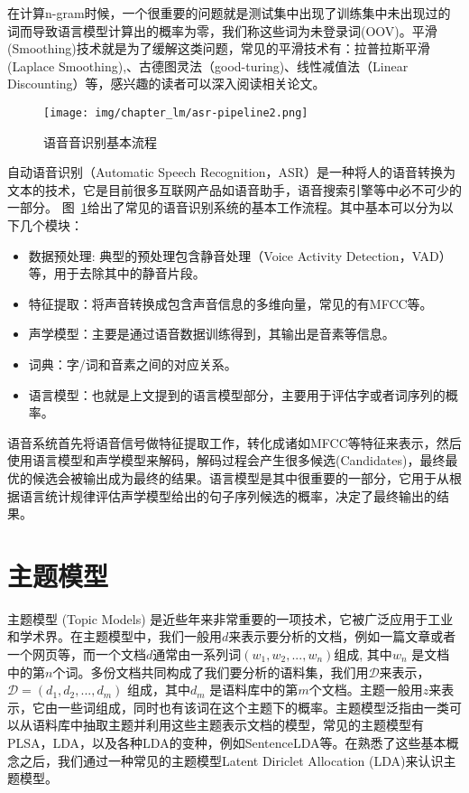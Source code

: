 在计算n-gram时候，一个很重要的问题就是测试集中出现了训练集中未出现过的词而导致语言模型计算出的概率为零，我们称这些词为未登录词(OOV)。平滑(Smoothing)技术就是为了缓解这类问题，常见的平滑技术有：拉普拉斯平滑(Laplace Smoothing),、古德图灵法（good-turing)、线性减值法（Linear Discounting）等，感兴趣的读者可以深入阅读相关论文。

\begin{figure}[h!]
	\begin{center}
		\texttt{[image: img/chapter\_lm/asr-pipeline2.png]}
		\caption{语音音识别基本流程}
		\label{pic:asr}
	\end{center}
\end{figure}

自动语音识别（Automatic Speech Recognition，ASR）是一种将人的语音转换为文本的技术，它是目前很多互联网产品如语音助手，语音搜索引擎等中必不可少的一部分。
图~\ref{pic:asr}给出了常见的语音识别系统的基本工作流程。其中基本可以分为以下几个模块：
\begin{itemize}
    \item 数据预处理: 典型的预处理包含静音处理（Voice Activity Detection，VAD）等，用于去除其中的静音片段。
	\item 特征提取：将声音转换成包含声音信息的多维向量，常见的有MFCC等。
	\item 声学模型：主要是通过语音数据训练得到，其输出是音素等信息。
	\item 词典：字/词和音素之间的对应关系。
	\item 语言模型：也就是上文提到的语言模型部分，主要用于评估字或者词序列的概率。
\end{itemize}

\noindent 语音系统首先将语音信号做特征提取工作，转化成诸如MFCC等特征来表示，然后使用语言模型和声学模型来解码，解码过程会产生很多候选(Candidates)，最终最优的候选会被输出成为最终的结果。语言模型是其中很重要的一部分，它用于从根据语言统计规律评估声学模型给出的句子序列候选的概率，决定了最终输出的结果。


\section{主题模型}

主题模型 (Topic Models) 是近些年来非常重要的一项技术，它被广泛应用于工业和学术界。在主题模型中，我们一般用$d$来表示要分析的文档，例如一篇文章或者一个网页等，而一个文档$d$通常由一系列词$(w_1, w_2, ..., w_n)$组成, 其中$w_n$ 是文档中的第$n$个词。多份文档共同构成了我们要分析的语料集，我们用$\mathcal{D}$来表示，$\mathcal{D}=(d_1, d_2, ..., d_m)$ 组成，其中$d_m$ 是语料库中的第$m$个文档。主题一般用$z$来表示，它由一些词组成，同时也有该词在这个主题下的概率。主题模型泛指由一类可以从语料库中抽取主题并利用这些主题表示文档的模型，常见的主题模型有PLSA，LDA，以及各种LDA的变种，例如SentenceLDA等。在熟悉了这些基本概念之后，我们通过一种常见的主题模型Latent Diriclet Allocation (LDA)来认识主题模型。

